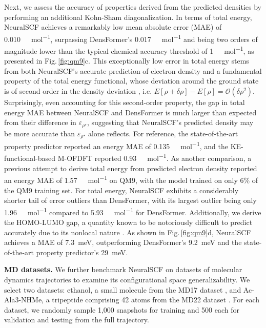 \documentclass[%
reprint,
superscriptaddress,
bibnotes,
amsmath,amssymb,
aps,
floatfix, %
]{revtex4-2}
\begin{document}
Next, we assess the accuracy of properties derived from the predicted densities by performing an additional Kohn-Sham diagonalization. In terms of total energy, NeuralSCF achieves a remarkably low mean absolute error (MAE) of \SI{0.010}{\kilo\cal\per\mol}, surpassing DensFormer's \SI{0.017}{\kilo\cal\per\mol} and being two orders of magnitude lower than the typical chemical accuracy threshold of \SI{1}{\kilo\cal\per\mol}, as presented in Fig.\,\ref{fig:qm9}c. This exceptionally low error in total energy stems from both NeuralSCF's accurate prediction of electron density and a fundamental property of the total energy functional, whose deviation around the ground state is of second order in the density deviation \cite{engel2011density}, i.e. $E[\rho + \delta \rho] - E[\rho] = \mathcal{O}(\delta\rho^2)$. Surprisingly, even accounting for this second-order property, the gap in total energy MAE between NeuralSCF and DensFormer is much larger than expected from their difference in $\varepsilon_{\rho^\star}$, suggesting that NeuralSCF's predicted density may be more accurate than $\varepsilon_{\rho^\star}$ alone reflects. For reference, the state-of-the-art property predictor reported an energy MAE of \SI{0.135}{\kilo\cal\per\mol}, and the KE-functional-based M-OFDFT \cite{zhang2024ofdft} reported \SI{0.93}{\kilo\cal\per\mol}. As another comparison, a previous attempt to derive total energy from predicted electron density \cite{grisafi2023} reported an energy MAE of \SI{1.57}{\kilo\cal\per\mol} on QM9, with the model trained on only 6\% of the QM9 training set. For total energy, NeuralSCF exhibits a considerably shorter tail of error outliers than DensFormer, with its largest outlier being only \SI{1.96}{\kilo\cal\per\mol} compared to \SI{5.93}{\kilo\cal\per\mol} for DensFormer. Additionally, we derive the HOMO-LUMO gap, a quantity known to be notoriously difficult to predict accurately due to its nonlocal nature \cite{grisafi2023}. As shown in Fig.\,\ref{fig:qm9}d, NeuralSCF achieves a MAE of \SI{7.3}{\milli\electronvolt}, outperforming DensFormer’s \SI{9.2}{\milli\electronvolt} and the state-of-the-art property predictor’s \SI{29}{\milli\electronvolt}. 

\vspace*{\baselineskip}

\noindent\textbf{MD datasets.} We further benchmark NeuralSCF on datasets of molecular dynamics trajectories to examine its configurational space generalizability. We select two datasets: ethanol, a small molecule from the MD17 dataset \cite{chmiela2017md17}, and Ac-Ala3-NHMe, a tripeptide comprising 42 atoms from the MD22 dataset \cite{chmiela2023md22}. For each dataset, we randomly sample 1,000 snapshots for training and 500 each for validation and testing from the full trajectory.
\end{document}

